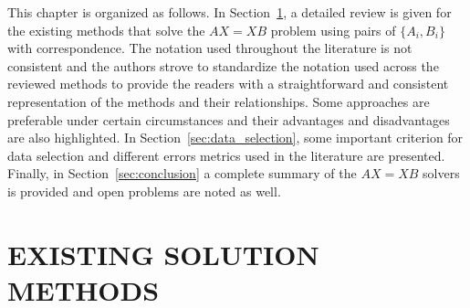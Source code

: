 \documentclass[twocolumn,10pt]{asme2ej}
\begin{document}
%
%
This chapter is organized as follows. 
In Section~\ref{sec:sol_methods}, a detailed review is given for the existing methods that solve the $AX=XB$ problem using pairs of $\{A_{i}, B_{i}\}$ with correspondence. The notation used throughout the literature is not consistent and the authors strove %
to standardize the notation used across the reviewed methods
to provide the readers with a straightforward and consistent representation of the methods and their relationships. %
Some approaches are preferable under certain circumstances and their advantages and disadvantages are also highlighted. 
In Section~\ref{sec:data_selection}, some important criterion for data selection and different errors metrics used in the literature are presented. 
Finally, in Section~\ref{sec:conclusion} a complete summary of the $AX=XB$ solvers is provided and open problems are noted as well.    

\section{EXISTING SOLUTION METHODS}
\label{sec:sol_methods}
 
\end{document}
